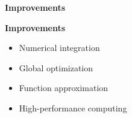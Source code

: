 \begin{frame}\begin{center}
\LARGE\textbf{Improvements}
\end{center}\end{frame}
\begin{frame}

\textbf{Improvements}\vspace{0.5cm}
\begin{itemize}\setlength\itemsep{1em}
\item Numerical integration 
\item Global optimization 
\item Function approximation  
\item High-performance computing  
\end{itemize}
\end{frame}

